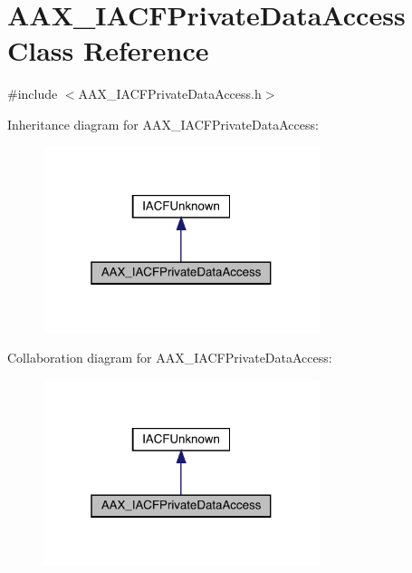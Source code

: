 \hypertarget{a01741}{}\section{A\+A\+X\+\_\+\+I\+A\+C\+F\+Private\+Data\+Access Class Reference}
\label{a01741}


{\ttfamily \#include $<$A\+A\+X\+\_\+\+I\+A\+C\+F\+Private\+Data\+Access.\+h$>$}



Inheritance diagram for A\+A\+X\+\_\+\+I\+A\+C\+F\+Private\+Data\+Access\+:
\nopagebreak
\begin{figure}[H]
\begin{center}
\leavevmode
\includegraphics[width=229pt]{a01740}
\end{center}
\end{figure}


Collaboration diagram for A\+A\+X\+\_\+\+I\+A\+C\+F\+Private\+Data\+Access\+:
\nopagebreak
\begin{figure}[H]
\begin{center}
\leavevmode
\includegraphics[width=229pt]{a01739}
\end{center}
\end{figure}


